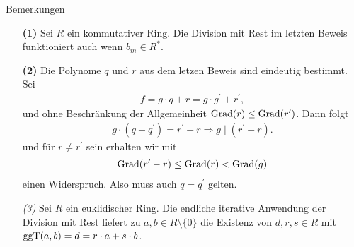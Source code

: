 \begin{genericdf}{Bemerkungen} \label{skript:7.11}
	\
	\begin{enumerate}
		\item[\textbf{(1)}]
		Sei $R$ ein kommutativer Ring.
 		Die Division mit Rest im letzten Beweis funktioniert auch wenn $b_m \in R^\ast$.
 		
 		\item[\textbf{(2)}]
 		Die Polynome $q$ und $r$ aus dem letzen Beweis sind eindeutig bestimmt.
 		Sei 
 		\begin{align*}
 		f = g \cdot q + r = g \cdot g^\prime + r^\prime,
 		\end{align*}
 		und ohne Beschränkung der Allgemeinheit $\operatorname{Grad}(r) \leq \operatorname{Grad}(r^\prime)$.
 		Dann folgt 
 		\begin{align*}
 		g \cdot (q - q^\prime) = r^\prime -r 
 		\Rightarrow g \mid (r^\prime -r ).
 		\end{align*}
 		und für $r \neq r^\prime$ sein erhalten wir mit
 		\begin{align*}
 		\operatorname{Grad}(r^\prime- r) \leq \operatorname{Grad}(r) < \operatorname{Grad}(g)
 		\end{align*}
 		einen Widerspruch.
 		Also muss auch $q = q^\prime$ gelten.
 		
 		\item[\textit{(3)}]
	 	Sei $R$ ein euklidischer Ring.
	 	Die endliche iterative Anwendung der Division mit Rest
	 	liefert zu $a,b \in R \setminus \lbrace 0 \rbrace$ die Existenz von 
	 	$d, r , s \in R$ mit $\operatorname{ggT}(a,b) = d = r \cdot a + s \cdot b$. 		
 		
	\end{enumerate}
\end{genericdf}